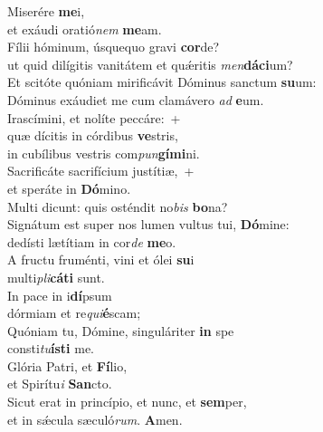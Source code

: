 \evenverse Miserére \textbf{me}i,~\*\\
\evenverse et exáudi oratió\textit{nem} \textbf{me}am.\\
\oddverse Fílii hóminum, úsquequo gravi \textbf{cor}de?~\*\\
\oddverse ut quid dilígitis vanitátem et quǽritis \textit{men}\textbf{dá}\textbf{ci}um?\\
\evenverse Et scitóte quóniam mirificávit Dóminus sanctum \textbf{su}um:~\*\\
\evenverse Dóminus exáudiet me cum clamávero \textit{ad} \textbf{e}um.\\
\oddverse Irascímini, et nolíte peccáre:~+\\
\oddverse  quæ dícitis in córdibus \textbf{ve}stris,~\*\\
\oddverse in cubílibus vestris com\textit{pun}\textbf{gí}\textbf{mi}ni.\\
\evenverse Sacrificáte sacrifícium justítiæ,~+\\
\evenverse  et speráte in \textbf{Dó}mino.~\*\\
\evenverse Multi dicunt: quis osténdit no\textit{bis} \textbf{bo}na?\\
\oddverse Signátum est super nos lumen vultus tui, \textbf{Dó}mine:~\*\\
\oddverse dedísti lætítiam in cor\textit{de} \textbf{me}o.\\
\evenverse A fructu fruménti, vini et ólei \textbf{su}i~\*\\
\evenverse multi\textit{pli}\textbf{cá}\textbf{ti} sunt.\\
\oddverse In pace in i\textbf{dí}psum~\*\\
\oddverse dórmiam et re\textit{qui}\textbf{é}scam;\\
\evenverse Quóniam tu, Dómine, singuláriter \textbf{in} spe~\*\\
\evenverse consti\textit{tu}\textbf{í}\textbf{sti} me.\\
\oddverse Glória Patri, et \textbf{Fí}lio,~\*\\
\oddverse et Spirítu\textit{i} \textbf{San}cto.\\
\evenverse Sicut erat in princípio, et nunc, et \textbf{sem}per,~\*\\
\evenverse et in sǽcula sæculó\textit{rum}. \textbf{A}men.\\
